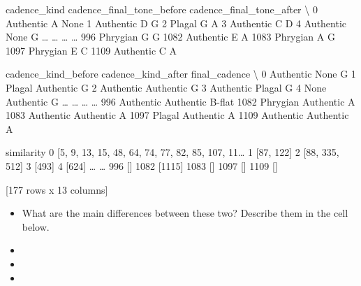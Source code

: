 \documentclass[letterpaper,10pt,english]{sphinxmanual}
\begin{document}
{\begin{sphinxVerbatim}[commandchars=\\\{\}]
     cadence\_kind cadence\_final\_tone\_before cadence\_final\_tone\_after  \textbackslash{}
0       Authentic                         A                     None
1       Authentic                         D                        G
2          Plagal                         G                        A
3       Authentic                         C                        D
4       Authentic                      None                        G
{\ldots}           {\ldots}                       {\ldots}                      {\ldots}
996      Phrygian                         G                        G
1082    Authentic                         E                        A
1083     Phrygian                         A                        G
1097     Phrygian                         E                        C
1109    Authentic                         C                        A

     cadence\_kind\_before cadence\_kind\_after final\_cadence  \textbackslash{}
0              Authentic               None             G
1                 Plagal          Authentic             G
2              Authentic          Authentic             G
3              Authentic             Plagal             G
4                   None          Authentic             G
{\ldots}                  {\ldots}                {\ldots}           {\ldots}
996            Authentic          Authentic        B-flat
1082            Phrygian          Authentic             A
1083           Authentic          Authentic             A
1097              Plagal          Authentic             A
1109           Authentic          Authentic             A

                                             similarity
0     [5, 9, 13, 15, 48, 64, 74, 77, 82, 85, 107, 11{\ldots}
1                                             [87, 122]
2                                        [88, 335, 512]
3                                                 [493]
4                                                 [624]
{\ldots}                                                 {\ldots}
996                                                  []
1082                                             [1115]
1083                                                 []
1097                                                 []
1109                                                 []

[177 rows x 13 columns]
\end{sphinxVerbatim}
}
\begin{itemize}
\item {} 
What are the main differences between these two? Describe them in the cell below.

\end{itemize}
\begin{itemize}
\item {} 
\item {} 
\item {} 
\end{itemize}
\end{document}
